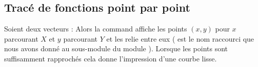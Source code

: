 \documentclass[11pt,class=report,crop=false]{standalone}
\begin{document}
\subsection{Tracé de fonctions point par point}

Soient deux vecteurs :
Alors la command  affiche les points $(x,y)$ pour $x$ parcourant $X$ et $y$ parcourant $Y$ et les relie entre eux ( est le nom raccourci que nous avons donné au sous-module  du module \matplotlib{}). Lorsque les points sont suffisamment rapprochés cela donne l'impression d'une courbe lisse.

\end{document}
